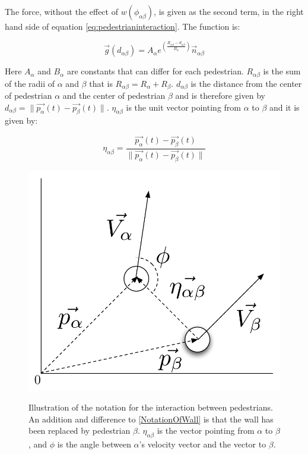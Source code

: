 
The force, without the effect of $w\left(\phi_{\alpha \beta}\right)$, is given as the second term, in the right hand side of equation \ref{eq:pedestrianinteraction}. The function is:  

\begin{equation}
	\overrightarrow{g} 
	\left(
	d_{\alpha \beta}
	\right)
	=
	 A_{\alpha} e^{ \left(\frac{ R_{\alpha \beta} - d_{\alpha \beta}}{B_{\alpha}}\right)}
	\overrightarrow{n}_{\alpha \beta}
	        \label{re}	
\end{equation}

Here $A_{\alpha}$ and $B_{\alpha}$ are constants that can differ for each pedestrian. 
$R_{\alpha \beta}$ is the sum of the radii of $\alpha$ and $\beta$ that is 
$R_{\alpha \beta} = R_{\alpha} + R_{\beta}$. $d_{\alpha \beta}$ is the 
distance from the center of pedestrian $\alpha$ and the center of 
pedestrian $\beta$ and is therefore given by $d_{\alpha \beta} = 
\|\overrightarrow{p_{\alpha}}\left( t \right) - \overrightarrow{p_{\beta}}\left( t \right) \|$.
$\eta_{\alpha \beta}$ is the unit vector pointing from $\alpha$ to $\beta$ 
and it is given by:

\begin{equation}
    \eta_{\alpha \beta} =
        \frac{\overrightarrow{p_{\alpha}}(t) - \overrightarrow{p_{\beta}}(t)}
             {\|\overrightarrow{p_{\alpha}}(t) - \overrightarrow{p_{\beta}}(t) \|}
\end{equation}

\begin{figure}[ht]
    \centering
    {\includegraphics[scale=0.35]{Figures/NotationOfInteraction.pdf}} 
    \caption[Notation of the interaction between two pedestrians]{Illustration of the notation for the interaction between pedestrians.
	     An addition and difference to \ref{NotationOfWall} is that the wall has been replaced by pedestrian $\beta$.
	     $\eta_{\alpha \beta}$ is the vector pointing from $\alpha$ to $\beta$, and $\phi$ is the angle between $\alpha$'s 
	     velocity vector and the vector to $\beta$.}
    \label{fig:NotationOfInteraction}
\end{figure}


